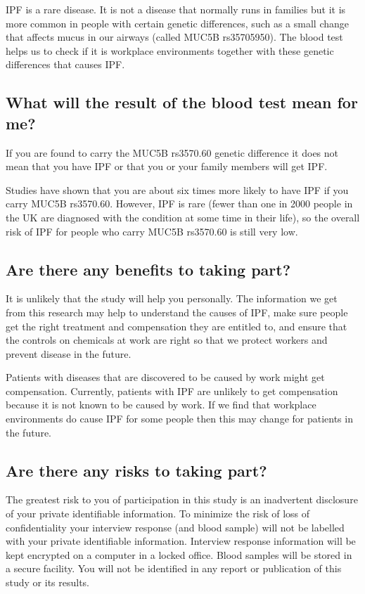 \documentclass[a4paper,10pt]{article}
\begin{document}
IPF is a rare disease. It is not a disease that normally runs in families but it is more common in people with certain genetic differences, such as a small change that affects mucus in our airways (called MUC5B rs35705950). The blood test helps us to check if it is workplace environments together with these genetic differences that causes IPF.   

\subsection*{What will the result of the blood test mean for me?}

If you are found to carry the MUC5B rs3570.60 genetic difference it does not mean that you have IPF or that you or your family members will get IPF. 

Studies have shown that you are about six times more likely to have IPF if you carry MUC5B rs3570.60. However, IPF is rare (fewer than one in 2000 people in the UK are diagnosed with the condition at some time in their life), so the overall risk of IPF for people who carry MUC5B rs3570.60 is still very low.    

\subsection*{Are there any benefits to taking part?}

It is unlikely that the study will help you personally. The information we get from this research may help to understand the causes of IPF, make sure people get the right treatment and compensation they are entitled to, and ensure that the controls on chemicals at work are right so that we protect workers and prevent disease in the future.

Patients with diseases that are discovered to be caused by work might get compensation. Currently, patients with IPF are unlikely to get compensation because it is not known to be caused by work. If we find that workplace environments do cause IPF for some people then this may change for patients in the future.   

\subsection*{Are there any risks to taking part?}

The greatest risk to you of participation in this study is an inadvertent disclosure of your private identifiable information. To minimize the risk of loss of confidentiality your interview response (and blood sample) will not be labelled with your private identifiable information. Interview response information will be kept encrypted on a computer in a locked office. Blood samples will be stored in a secure facility. You will not be identified in any report or publication of this study or its results.
\end{document}
